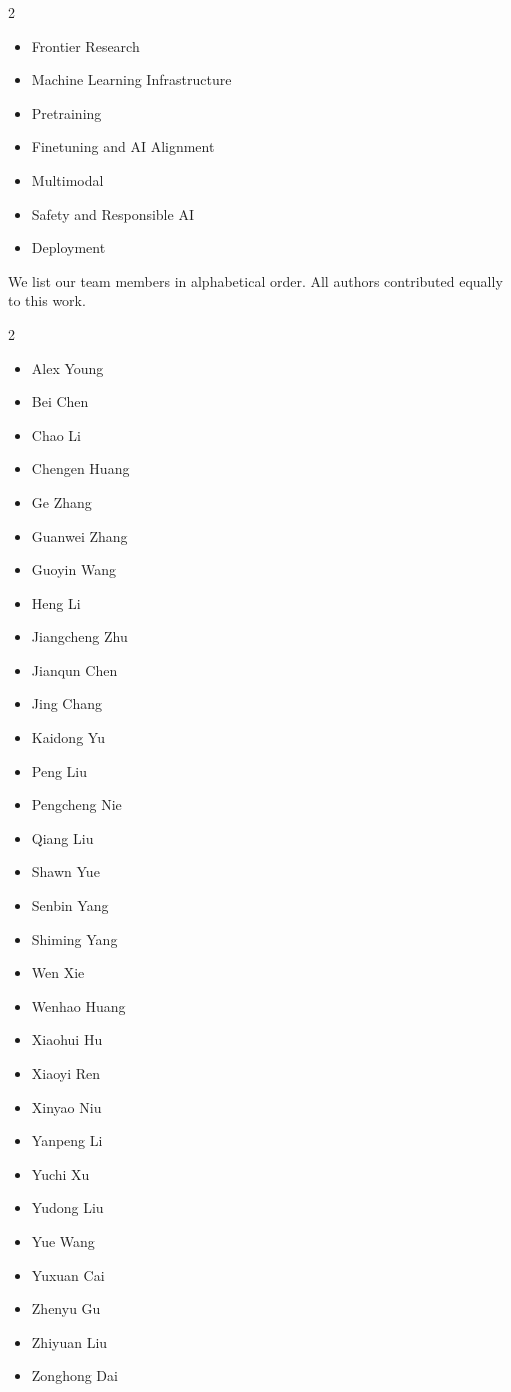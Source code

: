 \documentclass[numbers,sort&compress]{article}
\begin{document}
\begin{multicols}{2}
\begin{itemize}
    \item Frontier Research
    \item Machine Learning Infrastructure
    \item Pretraining
    \item Finetuning and AI Alignment
    \item Multimodal
    \item Safety and Responsible AI 
    \item Deployment
\end{itemize}
\end{multicols}

We list our team members in alphabetical order. All authors contributed equally to this work. 

\begin{multicols}{2}
\begin{itemize}
\item Alex Young
\item Bei Chen
\item Chao Li
\item Chengen Huang
\item Ge Zhang
\item Guanwei Zhang
\item Guoyin Wang
\item Heng Li
\item Jiangcheng Zhu
\item Jianqun Chen
\item Jing Chang
\item Kaidong Yu
\item Peng Liu
\item Pengcheng Nie
\item Qiang Liu
\item Shawn Yue
\item Senbin Yang
\item Shiming Yang
\item Wen Xie
\item Wenhao Huang
\item Xiaohui Hu
\item Xiaoyi Ren
\item Xinyao Niu
\item Yanpeng Li
\item Yuchi Xu
\item Yudong Liu
\item Yue Wang
\item Yuxuan Cai
\item Zhenyu Gu
\item Zhiyuan Liu
\item Zonghong Dai
\end{itemize}
\end{multicols}

\clearpage
  
\end{document}
